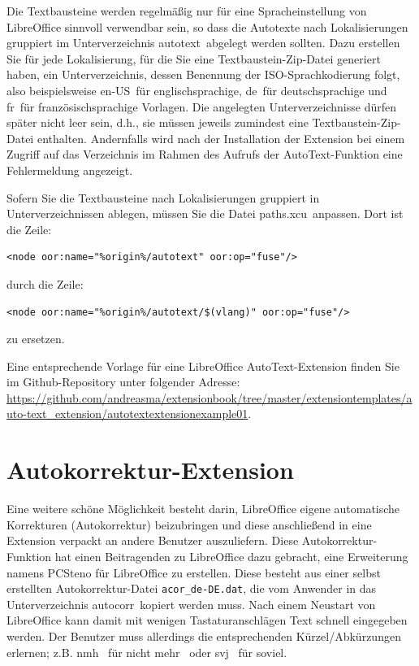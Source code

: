 \documentclass[a4paper,10pt,pagesize,titlepage]{scrbook}
\begin{document}
Die Textbausteine werden regelmäßig nur für eine Spracheinstellung von LibreOffice sinnvoll verwendbar sein, so dass die Autotexte nach Lokalisierungen gruppiert im Unterverzeichnis \glqq autotext\grqq~abgelegt werden sollten. Dazu erstellen Sie für jede Lokalisierung, für die Sie eine Textbaustein-Zip-Datei generiert haben, ein Unterverzeichnis, dessen Benennung der ISO-Sprachkodierung folgt, also  beispielsweise \glqq en-US\grqq~für englischsprachige, \glqq de\grqq~für deutschsprachige und \glqq fr\grqq~für französischsprachige Vorlagen. Die angelegten Unterverzeichnisse dürfen später nicht leer sein, d.h., sie müssen jeweils zumindest eine Textbaustein-Zip-Datei enthalten. Andernfalls wird nach der Installation der Extension bei einem Zugriff auf das Verzeichnis im Rahmen des Aufrufs der AutoText-Funktion eine Fehlermeldung angezeigt.

Sofern Sie die Textbausteine nach Lokalisierungen gruppiert in Unterverzeichnissen ablegen, müssen Sie die Datei \glqq paths.xcu\grqq~anpassen. Dort ist die Zeile:
\begin{lstlisting}
<node oor:name="%origin%/autotext" oor:op="fuse"/>
\end{lstlisting}

durch die Zeile:
\begin{lstlisting}
<node oor:name="%origin%/autotext/$(vlang)" oor:op="fuse"/>
\end{lstlisting}

zu ersetzen.

Eine entsprechende Vorlage für eine LibreOffice AutoText-Extension finden Sie im Github-Repository unter folgender Adresse:
\url{https://github.com/andreasma/extensionbook/tree/master/extensiontemplates/auto-text_extension/autotextextensionexample01}.

\section{Autokorrektur-Extension}

Eine weitere schöne Möglichkeit besteht darin, LibreOffice eigene automatische Korrekturen (Autokorrektur) beizubringen und diese anschließend in eine Extension verpackt an andere Benutzer auszuliefern. Diese Autokorrektur-Funktion hat einen Beitragenden zu LibreOffice dazu gebracht, eine Erweiterung namens PCSteno für LibreOffice zu erstellen. Diese besteht aus einer selbst erstellten Autokorrektur-Datei \verb|acor_de-DE.dat|, die vom Anwender in das Unterverzeichnis \glqq autocorr\grqq~kopiert werden muss. Nach einem Neustart von LibreOffice kann damit mit wenigen Tastaturanschlägen Text schnell eingegeben werden. Der Benutzer muss allerdings die entsprechenden Kürzel/Abkürzungen erlernen; z.B. \glqq nmh\grqq~ für \glqq nicht mehr\grqq~ oder \glqq svj\grqq~ für \glqq soviel\grqq.
\end{document}

